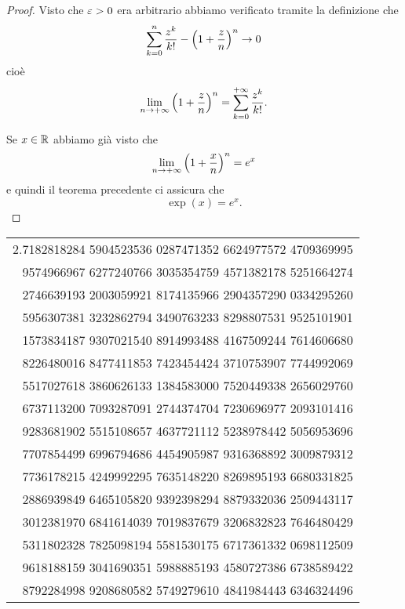 \begin{proof}
Visto che $\varepsilon>0$ era arbitrario abbiamo verificato
tramite la definizione che
\[
\sum_{k=0}^n \frac{z^k}{k!} - {\left( 1+\frac z n \right)}^n \to 0
\]
cioè
\[
\lim_{n\to +\infty} {\left( 1+\frac z n \right)}^n = \sum_{k=0}^{+\infty} \frac{z^k}{k!}.
\]

Se $x\in {\mathbb R}$ abbiamo già visto che
\[
  \lim_{n\to +\infty}{\left( 1+\frac x n \right)}^n = e^x
\]
e quindi il teorema precedente ci assicura che
\[
  \exp(x) = e^x.
\]
\end{proof}

\begin{table}
\begin{center}
\begin{tabular}{r}
\ttfamily\footnotesize 2.7182818284 5904523536 0287471352 6624977572 4709369995 \\
\ttfamily\footnotesize   9574966967 6277240766 3035354759 4571382178 5251664274 \\
\ttfamily\footnotesize   2746639193 2003059921 8174135966 2904357290 0334295260 \\
\ttfamily\footnotesize   5956307381 3232862794 3490763233 8298807531 9525101901 \\
\ttfamily\footnotesize   1573834187 9307021540 8914993488 4167509244 7614606680 \\
\ttfamily\footnotesize   8226480016 8477411853 7423454424 3710753907 7744992069 \\
\ttfamily\footnotesize   5517027618 3860626133 1384583000 7520449338 2656029760 \\
\ttfamily\footnotesize   6737113200 7093287091 2744374704 7230696977 2093101416 \\
\ttfamily\footnotesize   9283681902 5515108657 4637721112 5238978442 5056953696 \\
\ttfamily\footnotesize   7707854499 6996794686 4454905987 9316368892 3009879312 \\
\ttfamily\footnotesize   7736178215 4249992295 7635148220 8269895193 6680331825 \\
\ttfamily\footnotesize   2886939849 6465105820 9392398294 8879332036 2509443117 \\
\ttfamily\footnotesize   3012381970 6841614039 7019837679 3206832823 7646480429 \\
\ttfamily\footnotesize   5311802328 7825098194 5581530175 6717361332 0698112509 \\
\ttfamily\footnotesize   9618188159 3041690351 5988885193 4580727386 6738589422 \\
\ttfamily\footnotesize   8792284998 9208680582 5749279610 4841984443 6346324496 \\

\end{tabular}
\end{center}
\end{table}
